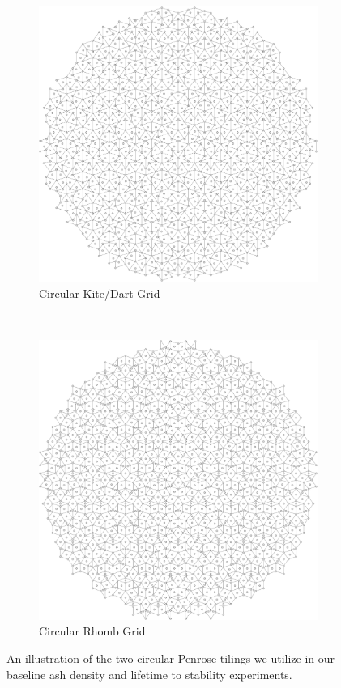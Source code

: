 \documentclass[a4paper,11pt,twoside]{report}
\begin{document}
\begin{figure}[htp]
\centering
\begin{subfigure}[t]{0.6\textwidth}
	\centering
	\includegraphics[width=\textwidth]{ch4_figs/ckd}
	\caption{Circular Kite/Dart Grid}
	\label{fig:kd_circ}
\end{subfigure}
~
\begin{subfigure}[t]{0.6\textwidth}
	\centering
	\includegraphics[width=\textwidth]{ch4_figs/crh}
	\caption{Circular Rhomb Grid}
	\label{fig:tt_circ}
\end{subfigure}

\caption[Circular Penrose Tilings]{
	An illustration of the two circular Penrose tilings we utilize in our baseline ash density and lifetime to stability experiments.
}
\label{fig:penrose_circ}
\end{figure}
\end{document}
